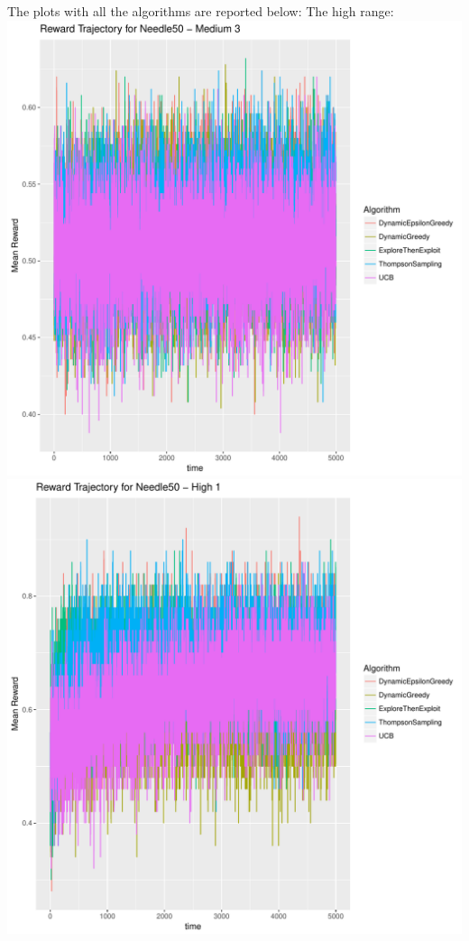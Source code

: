 \documentclass[11pt,letterpaper]{article}
\begin{document}
The plots with all the algorithms are reported below:
The high range: \\
\includegraphics[scale=0.5]{"../results/Reward Trajectory for Needle50 - Medium 3"} \\
\includegraphics[scale=0.5]{"../results/Reward Trajectory for Needle50 - High 1"} \\
\end{document}
